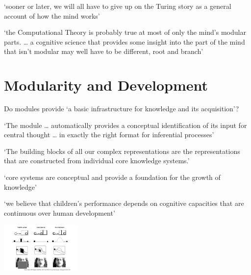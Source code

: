 \documentclass[11pt]{extarticle}
\begin{document}
\begin{multicols}{3}
‘sooner or later, we will all have to give up on the Turing story as a general account of how the mind works’\citep{Fodor:2000cj} %


‘the Computational Theory is probably true at most of only the mind’s modular parts.  …  a cognitive science that provides some insight into the part of the mind that isn’t modular may well have to be different, root and branch’\citep{Fodor:2000cj} %


\section{Modularity and Development}


Do modules provide ‘a basic infrastructure for knowledge and its acquisition’?\citep{Wellman:1998wb} %

‘The module … automatically provides a conceptual identification of its input for central thought … in exactly the right format for inferential processes’\citep{Leslie:1988ct} %

‘The building blocks of all our complex representations are the representations that are constructed from individual core knowledge systems.’\citep{Spelke:2003fc} %

‘core systems are conceptual and provide a foundation for the growth of knowledge’\citep{Carey:1996hl} %

`we believe that children’s performance depends on cognitive capacities that are continuous over human development’\citep{Spelke:2001pg} %


\begin{center}
  \includegraphics[width=0.3\textwidth]{fig1.png}
\end{center}




\end{multicols}
\end{document}
